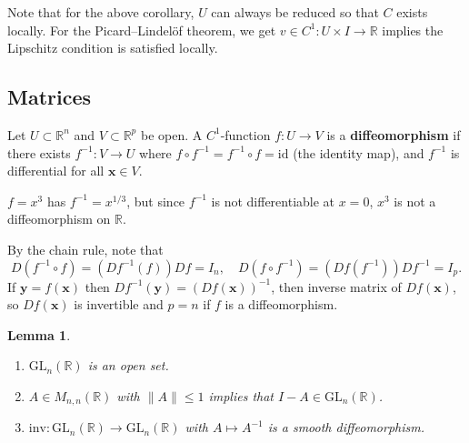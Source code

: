 \documentclass[letter-paper]{tufte-book}
\newtheorem{lemma}[theorem]{\color{pastel-blue}Lemma}
\newenvironment{example}[1][Example]{\begin{trivlist}
\item[\hskip \labelsep {\bfseries #1}]}{\end{trivlist}}
\begin{document}
Note that for the above corollary, $U$ can always be reduced so that $C$ exists
locally. For the Picard--Lindel\"of theorem, we get $v \in C^1 : U \times I \to
\mathbb{R}$ implies the Lipschitz condition is satisfied locally.


\subsection{Matrices}

Let $U \subset \mathbb{R}^n$ and $V \subset \mathbb{R}^p$ be open. A
$C^1$-function $f : U \to V$ is a \textbf{diffeomorphism} if there exists
$f^{-1} : V \to U$ where $f \circ f^{-1} = f^{-1} \circ f = \mbox{id}$ (the
identity map), and $f^{-1}$ is differential for all $\boldsymbol{x} \in V$.

\begin{example}
  $f = x^3$ has $f^{-1} = x^{1/3}$, but since $f^{-1}$ is not differentiable at
  $x=0$, $x^3$ is not a diffeomorphism on $\mathbb{R}$.
\end{example}

By the chain rule, note that
\begin{equation*}
  D(f^{-1} \circ f) = \left(Df^{-1}(f)\right) Df = I_n, \quad D(f \circ f^{-1}) = \left(Df(f^{-1})\right) Df^{-1} = I_p.
\end{equation*}
If $\boldsymbol{y} = f(\boldsymbol{x})$ then $Df^{-1}(\boldsymbol{y}) =
(Df(\boldsymbol{x}))^{-1}$, then inverse matrix of $Df(\boldsymbol{x})$, so
$Df(\boldsymbol{x})$ is invertible and $p=n$ if $f$ is a diffeomorphism.

\begin{lemma}
  \begin{enumerate}
    \item $\mbox{GL}_n(\mathbb{R})$ is an open set.
    \item $A \in M_{n,n}(\mathbb{R})$ with $\|A\| \leq 1$ implies that $I - A \in
    \mbox{GL}_n(\mathbb{R})$.
    \item $\mbox{inv} : \mbox{GL}_n(\mathbb{R}) \to \mbox{GL}_n(\mathbb{R})$
    with $A \mapsto A^{-1}$ is a smooth diffeomorphism.
  \end{enumerate}
\end{lemma}
\end{document}

